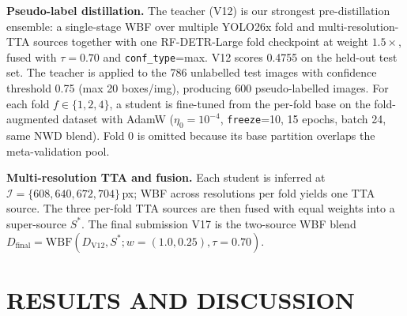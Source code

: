 \documentclass{article}
\begin{document}
\textbf{Pseudo-label distillation.} The teacher (V12) is our
strongest pre-distillation ensemble: a single-stage WBF
\cite{solovyev2021wbf} over multiple YOLO26x fold and
multi-resolution-TTA sources together with one RF-DETR-Large
\cite{roboflow2024rfdetr} fold checkpoint at weight $1.5\times$,
fused with $\tau{=}0.70$ and \texttt{conf\_type}=max. V12 scores
0.4755 on the held-out test set. The teacher is applied to the 786
unlabelled test images with confidence threshold 0.75 (max 20
boxes/img), producing 600 pseudo-labelled images. For each fold
$f\in\{1,2,4\}$, a student is fine-tuned from the per-fold base on
the fold-augmented dataset with AdamW \cite{loshchilov2019adamw}
($\eta_0{=}10^{-4}$, \texttt{freeze}=10, 15 epochs, batch 24, same
NWD blend). Fold 0 is omitted because its base partition overlaps the
meta-validation pool.

\textbf{Multi-resolution TTA and fusion.} Each student is inferred at
$\mathcal{I}=\{608,640,672,704\}$\,px; WBF across resolutions per
fold yields one TTA source. The three per-fold TTA sources are then
fused with equal weights into a super-source $S^{*}$. The final
submission V17 is the two-source WBF blend $D_{\mathrm{final}} =
\mathrm{WBF}(D_{\mathrm{V12}}, S^{*}; w{=}(1.0, 0.25), \tau{=}0.70)$.

\section{RESULTS AND DISCUSSION}
\label{sec:results}
\end{document}
